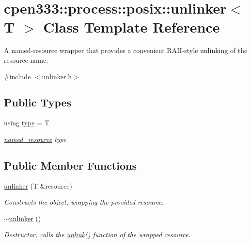 \hypertarget{classcpen333_1_1process_1_1posix_1_1unlinker}{}\section{cpen333\+:\+:process\+:\+:posix\+:\+:unlinker$<$ T $>$ Class Template Reference}
\label{classcpen333_1_1process_1_1posix_1_1unlinker}


A named-\/resource wrapper that provides a convenient R\+A\+I\+I-\/style unlinking of the resource name.  




{\ttfamily \#include $<$unlinker.\+h$>$}

\subsection*{Public Types}
\begin{DoxyCompactItemize}
\item 
\mbox{\label{classcpen333_1_1process_1_1posix_1_1unlinker_ae2d0ba15300eebd3aad3b645af8154eb}} 
using \hyperlink{classcpen333_1_1process_1_1posix_1_1unlinker_ae2d0ba15300eebd3aad3b645af8154eb}{type} = T
\begin{DoxyCompactList}\small\item\em \hyperlink{classcpen333_1_1process_1_1named__resource}{named\+\_\+resource} type \end{DoxyCompactList}\end{DoxyCompactItemize}
\subsection*{Public Member Functions}
\begin{DoxyCompactItemize}
\item 
\hyperlink{classcpen333_1_1process_1_1posix_1_1unlinker_a3a917c13138940b905f5ee4c70447748}{unlinker} (T \&resource)
\begin{DoxyCompactList}\small\item\em Constructs the object, wrapping the provided resource. \end{DoxyCompactList}\item 
\mbox{\label{classcpen333_1_1process_1_1posix_1_1unlinker_a4491078720a9accaec8f7cfac41cfb44}} 
\hyperlink{classcpen333_1_1process_1_1posix_1_1unlinker_a4491078720a9accaec8f7cfac41cfb44}{$\sim$unlinker} ()
\begin{DoxyCompactList}\small\item\em Destructor, calls the {\ttfamily \hyperlink{classcpen333_1_1process_1_1posix_1_1unlinker_af105f80e5698e59b5c3994ff228ed6c9}{unlink()}} function of the wrapped resource. \end{DoxyCompactList}\end{DoxyCompactItemize}
